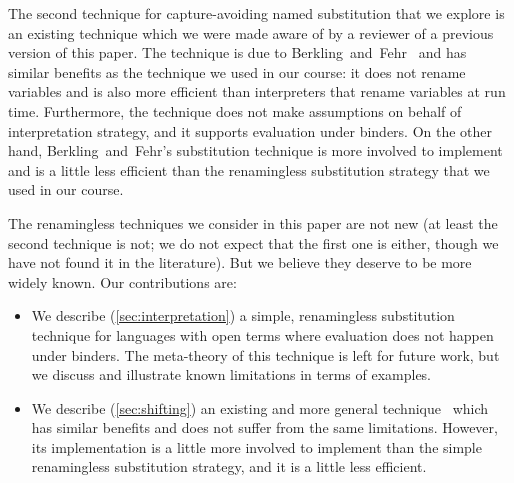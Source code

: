 The second technique for capture-avoiding named substitution that we explore is an existing technique which we were made aware of by a reviewer of a previous version of this paper.
The technique is due to Berkling~and~Fehr~\cite{berkling1982amodification} and has similar benefits as the technique we used in our course: it does not rename variables and is also more efficient than interpreters that rename variables at run time.
Furthermore, the technique does not make assumptions on behalf of interpretation strategy, and it supports evaluation under binders.
On the other hand, Berkling~and~Fehr's substitution technique is more involved to implement and is a little less efficient than the renamingless substitution strategy that we used in our course.

The renamingless techniques we consider in this paper are not new (at least the second technique is not; we do not expect that the first one is either, though we have not found it in the literature).
But we believe they deserve to be more widely known.
Our contributions are:
\begin{itemize}

\item
  We describe (\cref{sec:interpretation}) a simple, renamingless substitution technique for languages with open terms where evaluation does not happen under binders.
  The meta-theory of this technique is left for future work, but we discuss and illustrate known limitations in terms of examples.

\item
  We describe (\cref{sec:shifting}) an existing and more general technique~\cite{berkling1982amodification} which has similar benefits and does not suffer from the same limitations.
  However, its implementation is a little more involved to implement than the simple renamingless substitution strategy, and it is a little less efficient.

\end{itemize}







